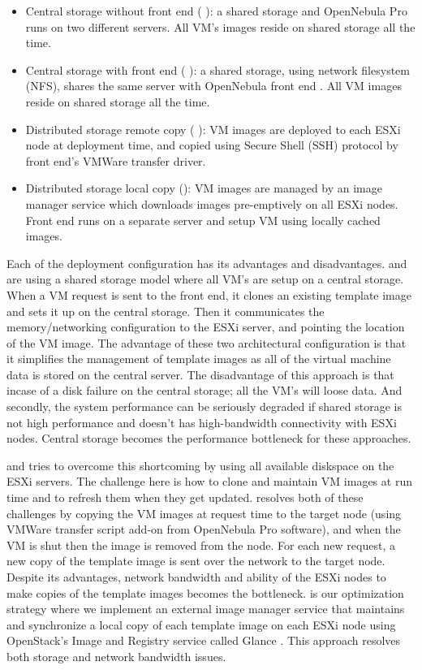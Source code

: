 \documentclass[acus]{JAC2003}
\begin{document}
\begin {itemize}
\item Central storage without front end (\textit{} ): a shared storage and OpenNebula Pro runs on two different servers. All VM's images reside on shared storage all the time. 
\item Central storage with front end (\textit{} ): a shared storage, using network filesystem (NFS), shares the same server with OpenNebula front end . All VM images reside on shared storage all the time.
\item Distributed storage remote copy (\textit{} ): VM images are deployed to each ESXi node at deployment time, and copied using Secure Shell (SSH) protocol by front end's VMWare transfer driver.
\item Distributed storage local copy (\textit{}): VM images are managed by an image manager service which downloads images pre-emptively on all ESXi nodes. Front end runs on a separate server and setup VM using locally cached images.
\end {itemize}

Each of the deployment configuration has its advantages and disadvantages. \textit{} and \textit{} are using a shared storage model where all VM's are setup on a central storage. When a VM request is sent to the front end, it clones an existing template image and sets it up on the central storage. Then it communicates the memory/networking configuration to the ESXi server, and pointing the location of the VM image. The advantage of these two architectural configuration is that it simplifies the management of template images as all of the virtual machine data is stored on the central server. The disadvantage of this approach is that incase of a disk failure on the central storage; all the VM's will loose data. And secondly, the system performance can be seriously degraded if shared storage is not high performance and doesn't has high-bandwidth connectivity with ESXi nodes. Central storage becomes the performance bottleneck for these approaches.

\textit{} and \textit{} tries to overcome this shortcoming by using all available diskspace on the ESXi servers. The challenge here is how to clone and maintain VM images at run time and to refresh them when they get updated. \textit{} resolves both of these challenges by copying the VM images at request time to the target node (using VMWare transfer script add-on from OpenNebula Pro software), and when the VM is shut then the image is removed from the node. For each new request, a new copy of the template image is sent over the network to the target node. Despite its advantages, network bandwidth and ability of the ESXi nodes to make copies of the template images becomes the bottleneck. \textit{} is our optimization strategy where we implement an external image manager service that maintains and synchronize a local copy of each template image on each ESXi node using OpenStack's Image and Registry service called Glance \cite{openstack}. This approach resolves both storage and network bandwidth issues. 
\end{document}
